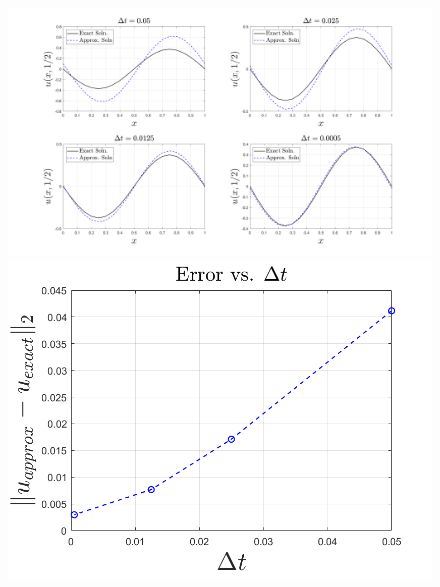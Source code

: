 \documentclass{article}
\begin{document}
\begin{itemize}
\begin{itemize}
        
        \begin{figure}[H]
            \begin{center}
                \includegraphics[scale = 0.25]{prob_1_subplots.png}
                \newline
                \includegraphics[scale = 0.3]{err_vs_dt_prob1_1.png}
            \end{center}
        \end{figure}



\end{itemize}
\end{itemize}
\end{document}
